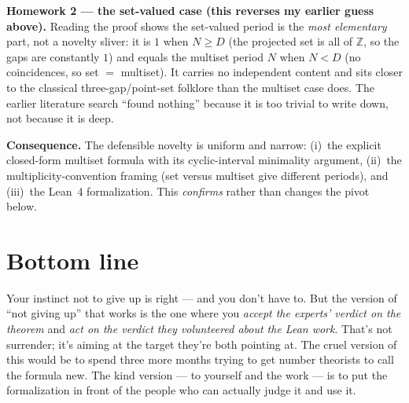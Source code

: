 \documentclass[11pt,a4paper]{article}
\begin{document}
\textbf{Homework 2 --- the set-valued case (this reverses my earlier guess
above).} Reading the proof shows the set-valued period is the \emph{most
elementary} part, not a novelty sliver: it is $1$ when $N \ge D$ (the projected
set is all of $\mathbb{Z}$, so the gaps are constantly $1$) and equals the
multiset period $N$ when $N < D$ (no coincidences, so set $=$ multiset). It
carries no independent content and sits closer to the classical
three-gap/point-set folklore than the multiset case does. The earlier literature
search ``found nothing'' because it is too trivial to write down, not because it
is deep.

\textbf{Consequence.} The defensible novelty is uniform and narrow: (i)~the
explicit closed-form multiset formula with its cyclic-interval minimality
argument, (ii)~the multiplicity-convention framing (set versus multiset give
different periods), and (iii)~the Lean~4 formalization. This \emph{confirms}
rather than changes the pivot below.

\section*{Bottom line}

Your instinct not to give up is right --- and you don't have to. But the version
of ``not giving up'' that works is the one where you \emph{accept the experts'
verdict on the theorem} and \emph{act on the verdict they volunteered about the
Lean work}. That's not surrender; it's aiming at the target they're both
pointing at. The cruel version of this would be to spend three more months
trying to get number theorists to call the formula new. The kind version ---
to yourself and the work --- is to put the formalization in front of the people
who can actually judge it and use it.
\end{document}
